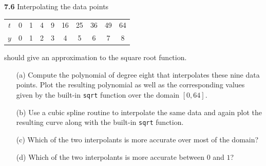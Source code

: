 \textbf{7.6}
Interpolating the data points
\begin{table}[H]
  \centering
\begin{tabular}{c|ccccccccc}
  $t$ & 0 & 1 & 4 & 9 & 16 & 25 & 36 & 49 & 64
  \\
  $y$ & 0 & 1 & 2 & 3 & 4 & 5 & 6 & 7 & 8
\end{tabular}
\end{table}
should give an approximation to the square root function.
\begin{itemize}
\item[(a)]
  Compute the polynomial of degree eight that interpolates these nine data points.
  Plot the resulting polynomial as well as the corresponding values given by the
  built-in \verb|sqrt| function over the domain $[0, 64]$.
\item[(b)]
  Use a cubic spline routine to interpolate the same data and
  again plot the resulting curve along with the built-in \verb|sqrt| function.
\item[(c)]
  Which of the two interpolants is more accurate over most of the domain?
\item[(d)]
  Which of the two interpolants is more accurate between $0$ and $1$?
\end{itemize}
